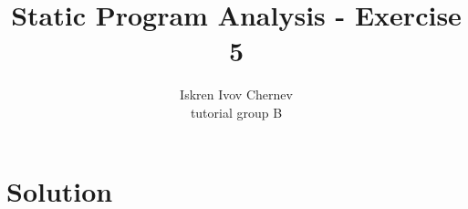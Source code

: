 \documentclass[a4paper]{article}
\begin{document}
\newcommand{\aee}[1] {[[#1]]^\sharp}
\newcommand{\cc}[1] {\texttt{#1}}
\def\A {\mathcal{A}}
\def\N {\mathcal{N}}
\def\NonZero {\mathrm{NonZero}}
\def\Zero {\mathrm{Zero}}
\def\Vars {\mathrm{Vars}}
\def\Occ {\mathrm{Occ}}

\title{Static Program Analysis - Exercise 5}
\author{Iskren Ivov Chernev \\ tutorial group B}

\maketitle

\section{Solution}
\end{document}
